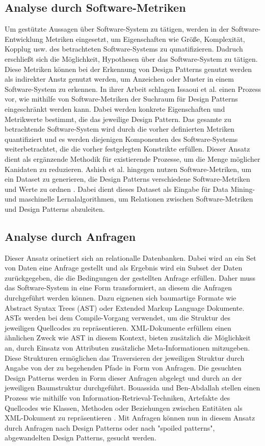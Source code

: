 \documentclass[conference]{IEEEtran}
\begin{document}
\subsection{Analyse durch Software-Metriken}

Um gestützte Aussagen über Software-System zu tätigen, werden in der Software-Entwicklung Metriken eingesetzt, um Eigenschaften wie Größe, Komplexität, Kopplug usw. des betrachteten Software-Systems zu qunatifizieren.
Dadruch erschließt sich die Möglichkeit, Hypothesen über das Software-System zu tätigen. Diese Metriken können bei der Erkennung von Design Patterns genutzt werden als indirekter Anstz genutzt werden, um Anzeichen oder Muster in einem Software-System zu erkennen.
In ihrer Arbeit schlagen Issaoui et al. \cite{Issaoui2015} einen Prozess vor, wie mithilfe von Software-Metriken der Suchraum für Design Patterns eingeschränkt werden kann. Dabei werden konkrete Eigenschaften und Metrikwerte bestimmt, die das jeweilige Design Pattern.
Das gesamte zu betrachtende Software-System wird durch die vorher definierten Metriken quantifiziert und es werden diejenigen Komponenten des Software-Systems weiterbetrachtet, die die vorher festgelegten Konstrikte erfüllen.
Dieser Ansatz dient als ergänzende Methodik für existierende Prozesse, um die Menge möglicher Kanidaten zu reduzieren.
Ashish et al. hingegen nutzen Software-Metriken, um ein Dataset zu generieren, die Design Patterns verschiedene Software-Metriken und Werte zu ordnen \cite{Ashish2016}. Dabei dient dieses Dataset als Eingabe für Data Mining- und maschinelle Lernalalgorithmen, um Relationen zwischen Software-Metriken und Design Patterns abzuleiten.


\subsection{Analyse durch Anfragen}

Dieser Ansatz orinetiert sich an relationalle Datenbanken. Dabei wird an ein Set von Daten eine Anfrage gestellt und als Ergebnis wird ein Subset der Daten zurückgegeben, die die Bedingungen der gestellten Anfrage erfüllen.
Daher muss das Software-System in eine Form transformiert, an diesem die Anfragen durchgeführt werden können. Dazu eignenen sich baumartige Formate wie Abstract Syntax Trees (AST) oder Extended Markup Language Dokumente.
ASTs werden bei dem Compile-Vorgang verwendet, um die Struktur des jeweiligen Quellcodes zu repräsentieren. XML-Dokumente erfüllem einen ähnlichen Zweck wie AST in diesem Kontext,
bieten zusätzlich die Möglichkeit an, durch Einsatz von Attributen zusätzliche Meta-Informationen mitzugeben. Diese Strukturen ermöglichen das Traversieren der jeweiligen Struktur durch Angabe von der zu begehenden Pfade in Form von Anfragen.
Die gesuchten Design Patterns werden in Form dieser Anfragen abgelegt und durch an der jeweiligen Baumstruktur durchgeführt.
Bouassida und Ben-Abdallah stellen einen Prozess wie mithilfe von Information-Retrieval-Techniken, Artefakte des Quellcodes wie Klassen, Methoden oder Beziehungen zwischen Entitäten als XML-Dokument zu repräsentieren \cite{bouassida2010pattern}.
Mit Anfragen können nun in diesem Ansatz durch Anfragen nach Design Patterns oder nach "spoiled patterns", abgewandelten Design Patterns, gesucht werden.
\end{document}
